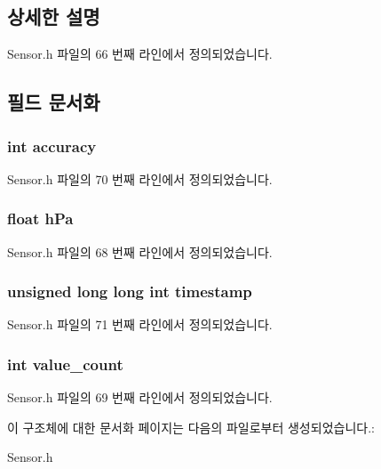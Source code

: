 \subsection{상세한 설명}


Sensor.\-h 파일의 66 번째 라인에서 정의되었습니다.



\subsection{필드 문서화}
\hypertarget{struct___pressure__data_a5565cf9073275f9713f9016e7c10d25f}{
\subsubsection[{accuracy}]{\setlength{\rightskip}{0pt plus 5cm}int accuracy}}\label{struct___pressure__data_a5565cf9073275f9713f9016e7c10d25f}


Sensor.\-h 파일의 70 번째 라인에서 정의되었습니다.

\hypertarget{struct___pressure__data_af5bafbc5db27b95f2b41516f5f61336f}{
\subsubsection[{h\-Pa}]{\setlength{\rightskip}{0pt plus 5cm}float h\-Pa}}\label{struct___pressure__data_af5bafbc5db27b95f2b41516f5f61336f}


Sensor.\-h 파일의 68 번째 라인에서 정의되었습니다.

\hypertarget{struct___pressure__data_a8de02c4128636a7bf630ff5428f60c8d}{
\subsubsection[{timestamp}]{\setlength{\rightskip}{0pt plus 5cm}unsigned long long int timestamp}}\label{struct___pressure__data_a8de02c4128636a7bf630ff5428f60c8d}


Sensor.\-h 파일의 71 번째 라인에서 정의되었습니다.

\hypertarget{struct___pressure__data_a40a079bfc72408819dc78da308203a74}{
\subsubsection[{value\-\_\-count}]{\setlength{\rightskip}{0pt plus 5cm}int value\-\_\-count}}\label{struct___pressure__data_a40a079bfc72408819dc78da308203a74}


Sensor.\-h 파일의 69 번째 라인에서 정의되었습니다.



이 구조체에 대한 문서화 페이지는 다음의 파일로부터 생성되었습니다.\-:\begin{DoxyCompactItemize}
\item 
Sensor.\-h\end{DoxyCompactItemize}
